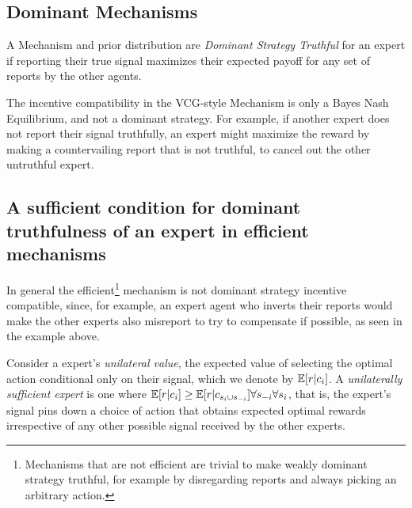 \subsection{Dominant Mechanisms}

\begin{defn}
	A Mechanism and prior distribution are \emph{Dominant Strategy Truthful} for an expert if reporting their true signal maximizes their expected payoff for any set of reports by the other agents. 
\end{defn}

The incentive compatibility in the VCG-style Mechanism is only a Bayes Nash Equilibrium, and not a dominant strategy. For example, if another expert does not report their signal truthfully, an expert might maximize the reward by making a countervailing report that is not truthful, to cancel out the other untruthful expert. 



\subsection{A sufficient condition for dominant truthfulness of an expert in efficient mechanisms}

In general the efficient\footnote{Mechanisms that are not efficient are trivial to make weakly dominant strategy truthful, for example by disregarding reports and always picking an arbitrary action.} mechanism is not dominant strategy incentive compatible, since, for example, an expert agent who inverts their reports would make the other experts also misreport to try to compensate if possible, as seen in the example above.

Consider a expert's \emph{unilateral value}, the expected value of selecting the optimal action conditional only on their signal, which we denote by  $\operatorname*{\mathbb E}[ r| c_{i}]$. A \emph{unilaterally sufficient expert} is one where $\operatorname*{\mathbb E}[r|c_{i}] \geq \operatorname*{\mathbb E}[r|c_{s_i \cup s_{-i}}] \forall s_{-i} \forall s_{i}$, that is, the expert's signal pins down a choice of action that obtains expected optimal rewards irrespective of any other possible signal received by the other experts.



